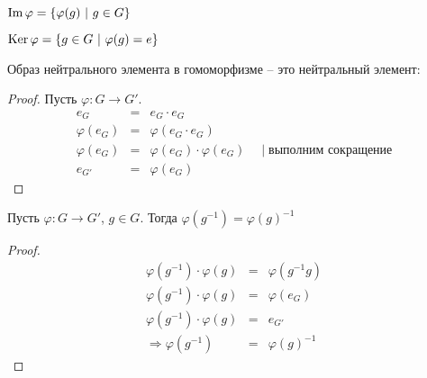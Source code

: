 \begin{conj}
  $\operatorname{Im} {\varphi} = \{ \varphi(g)\ |\ g\in G \}$

  $\operatorname{Ker}{\varphi} = \{ g \in G\ |\ \varphi(g) = e \}$
\end{conj}

\begin{theorem-non}
  Образ нейтрального элемента в гомоморфизме -- 
  это нейтральный элемент:

  \begin{proof}
    Пусть $\varphi \colon G \to G'$.
    \begin{eqnarray*}
      e_G &=& e_G \cdot e_G \\
      \varphi(e_G) &=& \varphi(e_G \cdot e_G) \\
      \varphi(e_G) &=& \varphi(e_G) \cdot \varphi(e_G)
      \quad \mid \text{выполним сокращение} \\
      e_{G'} &=& \varphi(e_G)
    \end{eqnarray*}
  \end{proof}
\end{theorem-non}

\begin{theorem-non}
  Пусть $\varphi \colon G \to G'$, $g \in G$.
  Тогда $\varphi(g^{-1}) = \varphi(g)^{-1}$

  \begin{proof}
    \begin{eqnarray*}
      \varphi(g^{-1}) \cdot \varphi(g) &=& \varphi(g^{-1}g) \\
      \varphi(g^{-1}) \cdot \varphi(g) &=& \varphi(e_G) \\
      \varphi(g^{-1}) \cdot \varphi(g) &=& e_{G'} \\
      \Rightarrow \varphi(g^{-1}) &=& \varphi(g)^{-1}
    \end{eqnarray*}
  \end{proof}
\end{theorem-non}


